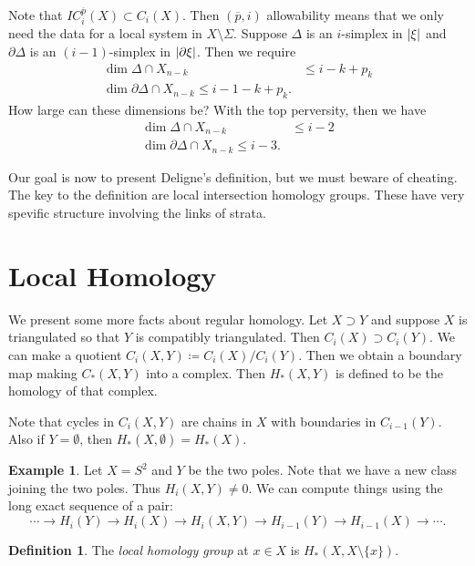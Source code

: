 \documentclass[leqno, openany]{memoir}
\DeclarePairedDelimiter{\abs}{\lvert}{\rvert}
\theoremstyle{definition}
\newtheorem{defn}[thm]{Definition}
\newtheorem{exm}[thm]{Example}
\theoremstyle{remark}
\theoremstyle{plain}
\theoremstyle{definition}
\theoremstyle{remark}
\begin{document}
Note that $IC_i^{\overline{p}}(X) \subset C_i(X)$. Then $(\overline{p}, i)$ allowability means that we only need the data for a local system in $X \setminus \Sigma$. Suppose $\Delta$ is an $i$-simplex in $\abs{\xi}$ and $\partial \Delta$ is an $(i-1)$-simplex in $\abs{\partial \xi}$. Then we require
\begin{align*}
    \dim \Delta \cap X_{n-k} & \leq i - k + p_k \\
    \dim \partial \Delta \cap X_{n-k} \leq i - 1 - k + p_k.
\end{align*}
How large can these dimensions be? With the top perversity, then we have
\begin{align*}
    \dim \Delta \cap X_{n-k} & \leq i - 2 \\
    \dim \partial \Delta \cap X_{n-k} \leq i - 3.
\end{align*}

Our goal is now to present Deligne's definition, but we must beware of cheating. The key to the definition are local intersection homology groups. These have very spevific structure involving the links of strata.

\section{Local Homology}%
\label{sec:local_homology}

We present some more facts about regular homology. Let $X \supset Y$ and suppose $X$ is triangulated so that $Y$ is compatibly triangulated. Then $C_i(X) \supset C_i(Y)$. We can make a quotient $C_i(X,Y) \coloneqq C_i(X) / C_i(Y)$. Then we obtain a boundary map making $C_*(X,Y)$ into a complex. Then $H_*(X,Y)$ is defined to be the homology of that complex.

Note that cycles in $C_i(X,Y)$ are chains in $X$ with boundaries in $C_{i-1}(Y)$. Also if $Y = \emptyset$, then $H_*(X, \emptyset) = H_*(X)$.

\begin{exm}
    Let $X = S^2$ and $Y$ be the two poles. Note that we have a new class joining the two poles. Thus $H_i(X,Y) \neq 0$. We can compute things using the long exact sequence of a pair:
    \[ \cdots \to H_i(Y) \to H_i(X) \to H_i(X,Y) \to H_{i-1}(Y) \to H_{i-1}(X) \to \cdots. \]
\end{exm}

\begin{defn}
    The \textit{local homology group} at $x \in X$ is $H_*(X, X \setminus \{x\})$.
\end{defn}
\end{document}
